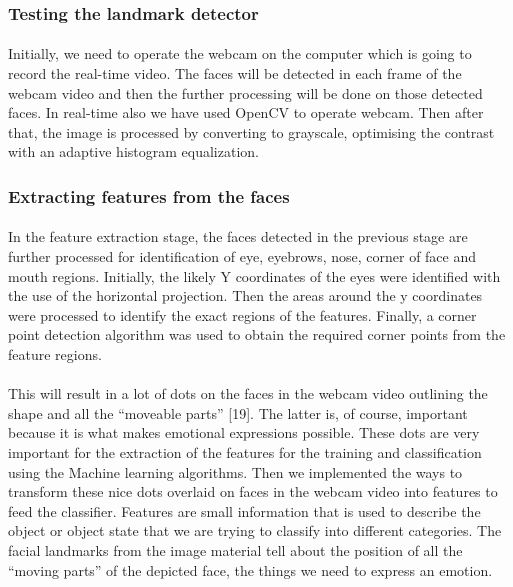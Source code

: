 \documentclass[a4paper,12pt,oneside]{article}
\begin{document}
\subsubsection{Testing the landmark detector}
\paragraph{}
Initially, we need to operate the webcam on the computer
which is going to record the real-time video. The faces
will be detected in each frame of the webcam video and
then the further processing will be done on those
detected faces. In real-time also we have used OpenCV
to operate webcam. Then after that, the image is
processed by converting to grayscale, optimising the
contrast with an adaptive histogram equalization.

\subsubsection{Extracting features from the faces}
\paragraph{}
In the feature extraction stage, the faces detected in the
previous stage are further processed for identification of
eye, eyebrows, nose, corner of face and mouth regions.
Initially, the likely Y coordinates of the eyes were
identified with the use of the horizontal projection. Then
the areas around the y coordinates were processed to
identify the exact regions of the features. Finally, a
corner point detection algorithm was used to obtain the
required corner points from the feature regions.

\paragraph{}
This will result in a lot of dots on the faces in the webcam
video outlining the shape and all the “moveable parts”
[19]. The latter is, of course, important because it is what
makes emotional expressions possible. These dots are
very important for the extraction of the features for the
training and classification using the Machine learning
algorithms. Then we implemented the ways to transform
these nice dots overlaid on faces in the webcam video
into features to feed the classifier. Features are small
information that is used to describe the object or object
state that we are trying to classify into
different categories. The facial landmarks from the
image material tell about the position of all the “moving
parts” of the depicted face, the things we need to express
an emotion.
\end{document}
